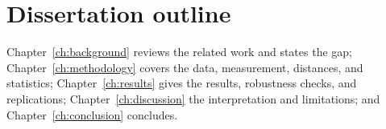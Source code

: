 \section{Dissertation outline}
Chapter~\ref{ch:background} reviews the related work and states the gap; Chapter~\ref{ch:methodology}
covers the data, measurement, distances, and statistics; Chapter~\ref{ch:results} gives the results,
robustness checks, and replications; Chapter~\ref{ch:discussion} the interpretation and limitations; and
Chapter~\ref{ch:conclusion} concludes.
